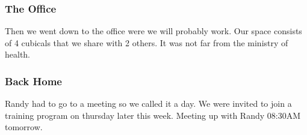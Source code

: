 \subsubsection{The Office}
Then we went down to the office were we will probably work. Our space consists of 4 cubicals that we share with 2 others.
It was not far from the ministry of health.
\subsubsection{Back Home}
Randy had to go to a meeting so we called it a day. We were invited to join a training program on thursday later this week. Meeting up with Randy 08:30AM tomorrow.
